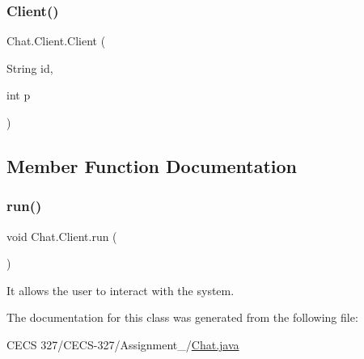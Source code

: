 \subsubsection{\texorpdfstring{Client()}{Client()}}
{\footnotesize\ttfamily Chat.\+Client.\+Client (\begin{DoxyParamCaption}\item[{String}]{id,  }\item[{int}]{p }\end{DoxyParamCaption})}



\subsection{Member Function Documentation}
\hypertarget{class_chat_1_1_client_af929f8bd324136e11afe64c92fa1cac3}{}\label{class_chat_1_1_client_af929f8bd324136e11afe64c92fa1cac3} 
\subsubsection{\texorpdfstring{run()}{run()}}
{\footnotesize\ttfamily void Chat.\+Client.\+run (\begin{DoxyParamCaption}{ }\end{DoxyParamCaption})}



It allows the user to interact with the system. 



The documentation for this class was generated from the following file\+:\begin{DoxyCompactItemize}
\item 
C\+E\+C\+S 327/\+C\+E\+C\+S-\/327/\+Assignment\+\_/\hyperlink{_chat_8java}{Chat.\+java}\end{DoxyCompactItemize}

